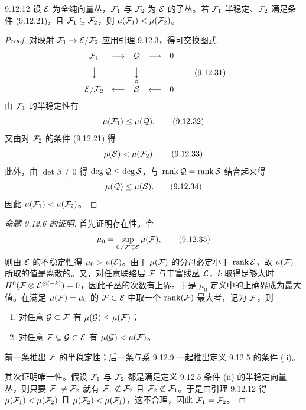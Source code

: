 
\begin{lemma*}{9.12.12}
  设 $\mathcal{E}$ 为全纯向量丛，$\mathcal{F}_1$ 与 $\mathcal{F}_2$ 为 $\mathcal{E}$ 的子丛。若 $\mathcal{F}_1$ 半稳定、$\mathcal{F}_2$ 满足条件 (9.12.21)，且 $\mathcal{F}_1\subsetneq\mathcal{F}_2$，则 $\mu(\mathcal{F}_1)<\mu(\mathcal{F}_2)$。
\end{lemma*}
\begin{proof}
  对映射 $\mathcal{F}_1\to\mathcal{E}/\mathcal{F}_2$ 应用引理 9.12.3，得可交换图式
  \begin{equation}
    \begin{array}{ccccc}
      \mathcal{F}_1&\longrightarrow&\mathcal{Q}&\longrightarrow&0\\[8pt]
      \big\downarrow&&\underset{\beta}{\big\downarrow}&&\\[8pt]
      \mathcal{E}/\mathcal{F}_2&\longleftarrow&\mathcal{S}&\longleftarrow&0
    \end{array}
    \tag{9.12.31}
  \end{equation}
  由 $\mathcal{F}_1$ 的半稳定性有
  \begin{equation}
    \mu(\mathcal{F}_1)\le\mu(\mathcal{Q}),
    \tag{9.12.32}
  \end{equation}
  又由对 $\mathcal{F}_2$ 的条件 (9.12.21) 得
  \begin{equation}
    \mu(\mathcal{S})<\mu(\mathcal{F}_2).
    \tag{9.12.33}
  \end{equation}
  此外，由 $\det\beta\ne0$ 得 $\deg\mathcal{Q}\le\deg\mathcal{S}$，与 $\operatorname{rank}\mathcal{Q}=\operatorname{rank}\mathcal{S}$ 结合起来得
  \begin{equation}
    \mu(\mathcal{Q})\le\mu(\mathcal{S}).
    \tag{9.12.34}
  \end{equation}
  因此 $\mu(\mathcal{F}_1)<\mu(\mathcal{F}_2)$。
\end{proof}

\begin{proof}[命题 9.12.6 的证明]
  首先证明存在性。令
  \begin{equation}
    \mu_0=\sup_{0\ne\mathcal{F}\subsetneq\mathcal{E}}\mu(\mathcal{F}),
    \tag{9.12.35}
  \end{equation}
  则由 $\mathcal{E}$ 的不稳定性得 $\mu_0>\mu(\mathcal{E})$。由于 $\mu(\mathcal{F})$ 的分母必定小于 $\operatorname{rank}\mathcal{E}$，故 $\mu(\mathcal{F})$ 所取的值是离散的。又，对任意联络层 $\mathcal{F}$ 与丰富线丛 $\mathcal{L}$，$k$ 取得足够大时 $H^0(\mathcal{F}\otimes\mathcal{L}^{\otimes(-k)})=0$，因此子丛的次数有上界。于是 $\mu_0$ 定义中的上确界成为最大值。在满足 $\mu(\mathcal{F})=\mu_0$ 的 $\mathcal{F}\subset\mathcal{E}$ 中取一个 $\operatorname{rank}(\mathcal{F})$ 最大者，记为 $\mathcal{F}$，则
  \begin{enumerate}[label=\arabic*.,leftmargin=2em,itemsep=1pt,topsep=2pt]
    \item 对任意 $\mathcal{G}\subset\mathcal{F}$ 有 $\mu(\mathcal{G})\le\mu(\mathcal{F})$；
    \item 对任意 $\mathcal{F}\subsetneq\mathcal{G}\subset\mathcal{E}$ 有 $\mu(\mathcal{G})<\mu(\mathcal{F})$。
  \end{enumerate}
  前一条推出 $\mathcal{F}$ 的半稳定性；后一条与系 9.12.9 一起推出定义 9.12.5 的条件 (ii)。

  其次证明唯一性。假设 $\mathcal{F}_1$ 与 $\mathcal{F}_2$ 都是满足定义 9.12.5 条件 (ii) 的半稳定向量丛，则只要 $\mathcal{F}_1\ne\mathcal{F}_2$ 就有 $\mathcal{F}_1\not\subset\mathcal{F}_2$ 且 $\mathcal{F}_2\not\subset\mathcal{F}_1$。于是由引理 9.12.12 得 $\mu(\mathcal{F}_1)<\mu(\mathcal{F}_2)$ 且 $\mu(\mathcal{F}_2)<\mu(\mathcal{F}_1)$，这不合理，因此 $\mathcal{F}_1=\mathcal{F}_2$。
\end{proof}


